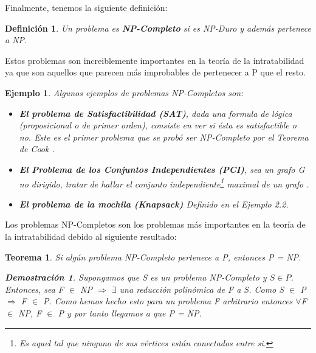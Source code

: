 \documentclass[a4paper,12pt,titlepage]{article}
\newtheorem{defi}{Definici\'on}[section]
\newtheorem{eje}{Ejemplo}[section]
\newtheorem{teo}{Teorema}[section]
\newtheorem*{dem}{\textbf{Demostraci\'on}}
\begin{document}
Finalmente, tenemos la siguiente definici\'on:

\begin{defi}

Un problema es \textbf{NP-Completo} si es NP-Duro y adem\'as pertenece a NP.

\end{defi}

Estos problemas son increiblemente importantes en la teor\'ia de la intratabilidad ya que son aquellos que parecen m\'as improbables de pertenecer a P que el resto.

\begin{eje}

Algunos ejemplos de problemas NP-Completos son:

\begin{itemize}

  \item \textbf{El problema de Satisfactibilidad (SAT)}, dada una formula de l\'ogica (proposicional o de primer orden), consiste en ver si \'esta es satisfactible o no. Este es el primer problema que se prob\'o ser NP-Completo por el Teorema de Cook \cite{AroraBarak}.
  \item \textbf{El Problema de los Conjuntos Independientes (PCI)}, sea un grafo G no dirigido, tratar de hallar el conjunto independiente\footnote{Es aquel tal que ninguno de sus v\'ertices est\'an conectados entre si.} maximal de un grafo \cite{approx_core}.
  \item \textbf{El problema de la mochila (Knapsack)} Definido en el Ejemplo 2.2.

\end{itemize}

\end{eje}

Los problemas NP-Completos son los problemas m\'as importantes en la teor\'ia de la intratabilidad debido al siguiente resultado:

\begin{teo}

Si alg\'un problema NP-Completo pertenece a P, entonces P = NP.

\begin{dem}

Supongamos que S es un problema NP-Completo y $S \in P$. Entonces, sea F $\in$ NP $\Rightarrow$ $\exists$ una reducci\'on polin\'omica de F a S. Como S $\in$ P $\Rightarrow$ F $\in$ P. Como hemos hecho esto para un problema F arbitrario entonces $\forall$F $\in$ NP, F $\in$ P y por tanto llegamos a que P = NP.

\end{dem}

\end{teo}
\end{document}
